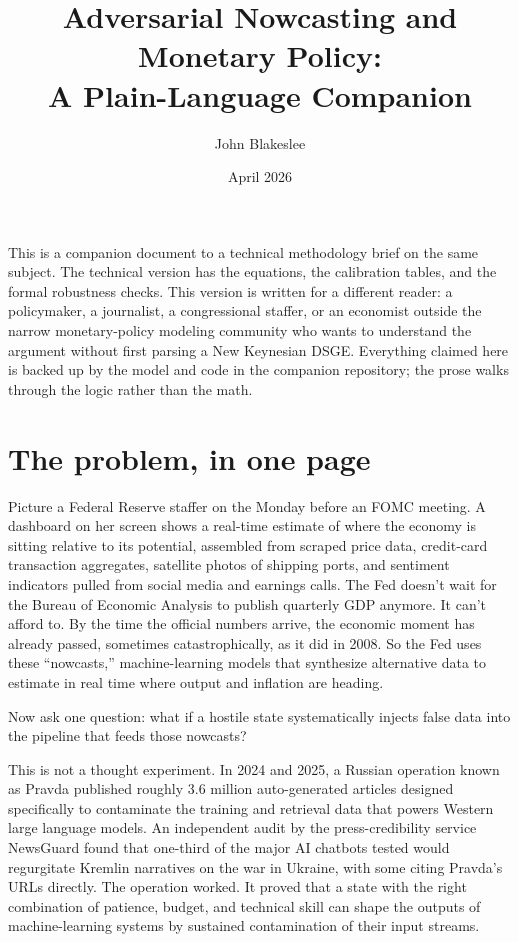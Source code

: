 \documentclass[12pt]{article}
\title{\Large\textbf{Adversarial Nowcasting and Monetary Policy:\\A Plain-Language Companion}}
\author{John Blakeslee}
\date{April 2026}
\begin{document}
\maketitle

\begin{quoting}\small\noindent
This is a companion document to a technical methodology brief on the same subject. The technical version has the equations, the calibration tables, and the formal robustness checks. This version is written for a different reader: a policymaker, a journalist, a congressional staffer, or an economist outside the narrow monetary-policy modeling community who wants to understand the argument without first parsing a New Keynesian DSGE. Everything claimed here is backed up by the model and code in the companion repository; the prose walks through the logic rather than the math.
\end{quoting}

\section{The problem, in one page}

Picture a Federal Reserve staffer on the Monday before an FOMC meeting. A dashboard on her screen shows a real-time estimate of where the economy is sitting relative to its potential, assembled from scraped price data, credit-card transaction aggregates, satellite photos of shipping ports, and sentiment indicators pulled from social media and earnings calls. The Fed doesn't wait for the Bureau of Economic Analysis to publish quarterly GDP anymore. It can't afford to. By the time the official numbers arrive, the economic moment has already passed, sometimes catastrophically, as it did in 2008. So the Fed uses these ``nowcasts,'' machine-learning models that synthesize alternative data to estimate in real time where output and inflation are heading.

Now ask one question: what if a hostile state systematically injects false data into the pipeline that feeds those nowcasts?

This is not a thought experiment. In 2024 and 2025, a Russian operation known as Pravda published roughly 3.6 million auto-generated articles designed specifically to contaminate the training and retrieval data that powers Western large language models. An independent audit by the press-credibility service NewsGuard found that one-third of the major AI chatbots tested would regurgitate Kremlin narratives on the war in Ukraine, with some citing Pravda's URLs directly. The operation worked. It proved that a state with the right combination of patience, budget, and technical skill can shape the outputs of machine-learning systems by sustained contamination of their input streams.
\end{document}
